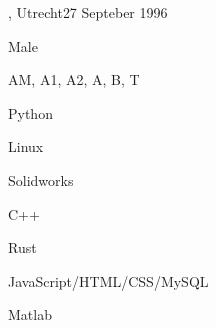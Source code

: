     
\begin{cSection}{\textwidth}{0.5\textwidth}{0.4\textwidth}
{%
\begin{rSection}{}
  \begin{experienceItem} {, Utrecht}{27 Septeber 1996}{}{} \end{experienceItem}
  \begin{experienceItem} {}{Male}{}{} \end{experienceItem}
  \begin{experienceItem} {}{AM, A1, A2, A, B, T}{}{} \end{experienceItem}
\end{rSection}

\begin{cSubsection}{}
  \begin{experienceItem} {}{Python}{}{} \end{experienceItem}
  \begin{experienceItem} {\hphantom{}}{Linux}{}{} \end{experienceItem}
  \begin{experienceItem} {\hphantom{}}{Solidworks}{}{} \end{experienceItem}

  \begin{experienceItem} {}{C++}{}{} \end{experienceItem}
  \begin{experienceItem} {\hphantom{}}{Rust}{}{} \end{experienceItem}
  \begin{experienceItem} {\hphantom{}}{JavaScript/HTML/CSS/MySQL}{}{} \end{experienceItem}
  \begin{experienceItem} {\hphantom{}}{Matlab}{}{} \end{experienceItem}
\end{cSubsection}

}
\end{cSection}
